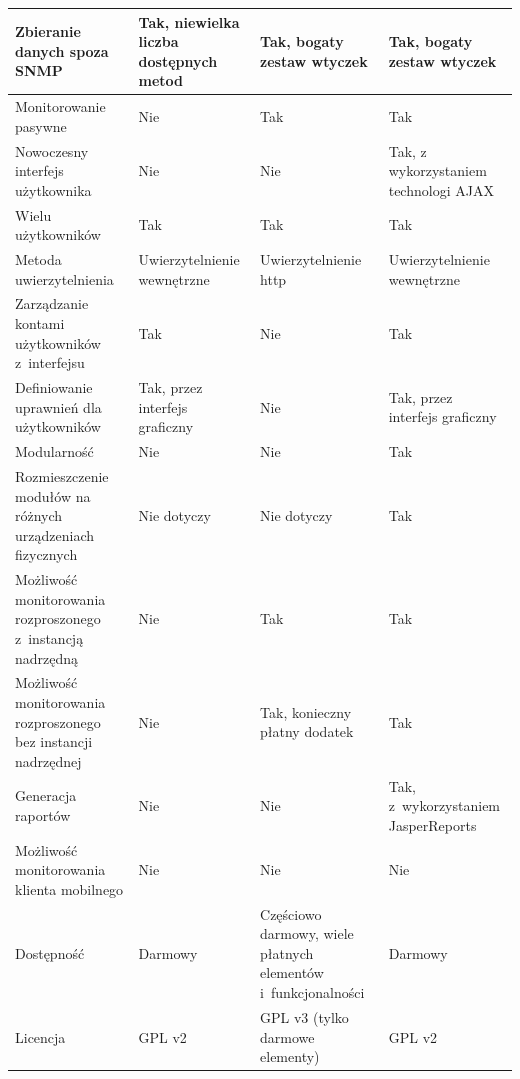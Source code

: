 \begin{longtable}[c]{|p{4.5cm}||p{3cm}|p{3cm}|p{3cm}|}
  \raggedright{Zbieranie danych spoza SNMP} & \raggedright{Tak, niewielka liczba dostępnych metod} &
  \raggedright{Tak, bogaty zestaw wtyczek} & \raggedright{Tak, bogaty zestaw wtyczek}
  \tabularnewline
  \hline

  \raggedright{Monitorowanie pasywne} & \raggedright{Nie} &
  \raggedright{Tak} & \raggedright{Tak}
  \tabularnewline
  \hline

  \raggedright{Nowoczesny interfejs użytkownika} & \raggedright{Nie} &
  \raggedright{Nie} & \raggedright{Tak, z wykorzystaniem technologi AJAX}
  \tabularnewline
  \hline

  \raggedright{Wielu użytkowników} & \raggedright{Tak} &
  \raggedright{Tak} & \raggedright{Tak}
  \tabularnewline
  \hline

  \raggedright{Metoda uwierzytelnienia} & \raggedright{Uwierzytelnienie wewnętrzne} &
  \raggedright{Uwierzytelnienie http} & \raggedright{Uwierzytelnienie wewnętrzne}
  \tabularnewline
  \hline

  \raggedright{Zarządzanie kontami użytkowników z~interfejsu} & \raggedright{Tak} &
  \raggedright{Nie} & \raggedright{Tak}
  \tabularnewline
  \hline

  \raggedright{Definiowanie uprawnień dla użytkowników} & \raggedright{Tak, przez interfejs graficzny} &
  \raggedright{Nie} & \raggedright{Tak, przez interfejs graficzny}
  \tabularnewline
  \hline

  \raggedright{Modularność} & \raggedright{Nie} &
  \raggedright{Nie} & \raggedright{Tak}
  \tabularnewline
  \hline

  \raggedright{Rozmieszczenie modułów na różnych urządzeniach fizycznych} & \raggedright{Nie dotyczy} &
  \raggedright{Nie dotyczy} & \raggedright{Tak}
  \tabularnewline
  \hline

  \raggedright{Możliwość monitorowania rozproszonego z~instancją
    nadrzędną} & \raggedright{Nie} & \raggedright{Tak} &
  \raggedright{Tak}
  \tabularnewline
  \hline

  \raggedright{Możliwość monitorowania rozproszonego bez instancji nadrzędnej} & \raggedright{Nie} &
  \raggedright{Tak, konieczny płatny dodatek} & \raggedright{Tak}
  \tabularnewline
  \hline

  \raggedright{Generacja raportów} & \raggedright{Nie} &
  \raggedright{Nie} & \raggedright{Tak, z~wykorzystaniem JasperReports}
  \tabularnewline
  \hline

  \raggedright{Możliwość monitorowania klienta mobilnego} & \raggedright{Nie} &
  \raggedright{Nie} & \raggedright{Nie}
  \tabularnewline
  \hline

  \raggedright{Dostępność} & \raggedright{Darmowy} &
  \raggedright{Częściowo darmowy, wiele płatnych elementów i~funkcjonalności} & \raggedright{Darmowy}
  \tabularnewline
  \hline

  \raggedright{Licencja} & \raggedright{GPL v2} &
  \raggedright{GPL v3 (tylko darmowe elementy)} & \raggedright{GPL v2}
  \tabularnewline
  \hline

\end{longtable}


